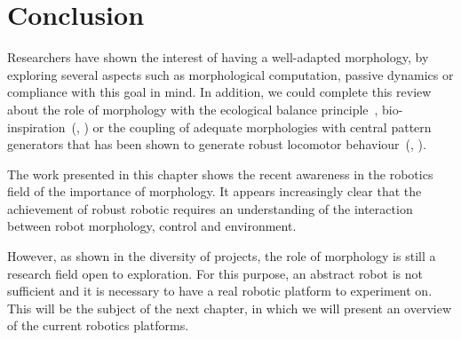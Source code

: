 \section{Conclusion} %

Researchers have shown the interest of having a well-adapted morphology, by exploring several aspects such as morphological computation, passive dynamics or compliance with this goal in mind. In addition, we could complete this review about the role of morphology with the ecological balance principle~\parencite{pfeifer2005new}, bio-inspiration~(\cite{scarfogliero2009use}, \cite{Pfeifer07}) or the coupling of adequate morphologies with central pattern generators that has been shown to generate robust locomotor behaviour~(\cite{ijspeert2007swimming}, \cite{steingrube2010self}).

The work presented in this chapter shows the recent awareness in the robotics field of the importance of morphology. It appears increasingly clear that the achievement of robust robotic requires an understanding of the interaction between robot morphology, control and environment.

However, as shown in the diversity of projects, the role of morphology is still a research field open to exploration. For this purpose, an abstract robot is not sufficient and it is necessary to have a real robotic platform to experiment on. This will be the subject of the next chapter, in which we will present an overview of the current robotics platforms.


